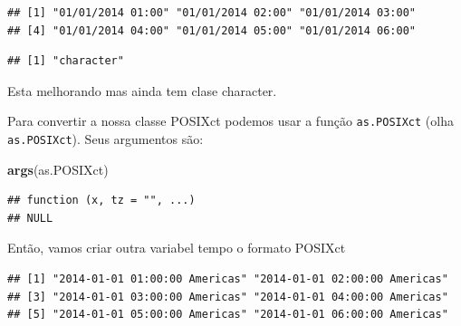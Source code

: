 \documentclass[]{book}
\newenvironment{Shaded}{\begin{snugshade}}{\end{snugshade}}
\newcommand{\KeywordTok}[1]{\textcolor[rgb]{0.13,0.29,0.53}{\textbf{#1}}}
\newcommand{\DataTypeTok}[1]{\textcolor[rgb]{0.13,0.29,0.53}{#1}}
\newcommand{\StringTok}[1]{\textcolor[rgb]{0.31,0.60,0.02}{#1}}
\newcommand{\OperatorTok}[1]{\textcolor[rgb]{0.81,0.36,0.00}{\textbf{#1}}}
\newcommand{\NormalTok}[1]{#1}
\theoremstyle{definition}
\theoremstyle{definition}
\theoremstyle{definition}
\theoremstyle{remark}
\begin{document}
\begin{verbatim}
## [1] "01/01/2014 01:00" "01/01/2014 02:00" "01/01/2014 03:00"
## [4] "01/01/2014 04:00" "01/01/2014 05:00" "01/01/2014 06:00"
\end{verbatim}

\begin{Shaded}
\end{Shaded}

\begin{verbatim}
## [1] "character"
\end{verbatim}

Esta melhorando mas ainda tem clase character.

Para convertir a nossa classe POSIXct podemos usar a função
\texttt{as.POSIXct} (olha \texttt{as.POSIXct}). Seus argumentos são:

\begin{Shaded}
\begin{Highlighting}[]
\KeywordTok{args}\NormalTok{(as.POSIXct)}
\end{Highlighting}
\end{Shaded}

\begin{verbatim}
## function (x, tz = "", ...) 
## NULL
\end{verbatim}

Então, vamos criar outra variabel tempo o formato POSIXct

\begin{Shaded}
\end{Shaded}

\begin{verbatim}
## [1] "2014-01-01 01:00:00 Americas" "2014-01-01 02:00:00 Americas"
## [3] "2014-01-01 03:00:00 Americas" "2014-01-01 04:00:00 Americas"
## [5] "2014-01-01 05:00:00 Americas" "2014-01-01 06:00:00 Americas"
\end{verbatim}
\end{document}
